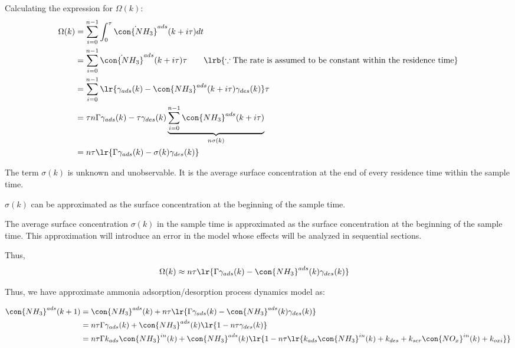 Calculating the expression for $\Omega(k)$:
\begin{align*}
    \Omega(k) &= \sum_{i=0}^{n-1} \int_{0}^{\tau} \dot{\con{NH_3}}^{ads} (k + i\tau) dt\\
    &= \sum_{i=0}^{n-1} \dot{\con{NH_3}}^{ads} (k + i\tau) \tau \qquad \lrb{\because \text{The rate is assumed to be constant within the residence time}}\\
    &= \sum_{i=0}^{n-1} \lr{\gamma_{ads} (k) - \con{NH_3}^{ads} (k + i \tau) \gamma_{des} (k)} \tau\\
    &= \tau n \Gamma \gamma_{ads} (k) - \tau \gamma_{des} (k) \underbrace{\sum_{i=0}^{n-1} \con{NH_3}^{ads} (k + i \tau) }_{n \sigma(k)} \\
    &= n \tau \lr{\Gamma \gamma_{ads} (k) - \sigma(k) \gamma_{des} (k)}
\end{align*}

The term $\sigma(k)$ is unknown and unobservable. It is the average surface
concentration at the end of every residence time within the sample time.

 $\sigma(k)$ can be approximated as the surface concentration at the beginning of the sample time.

The average surface concentration $\sigma(k)$ in the sample time is approximated
as the surface concentration at the beginning of the sample time. This
approximation will introduce an error in the model whose effects will be
analyzed in sequential sections.

Thus,
\begin{align}
    \Omega(k) &\approx n \tau \lr{\Gamma \gamma_{ads} (k) - \con{NH_3}^{ads}(k) \gamma_{des} (k)}
\end{align}

Thus, we have approximate ammonia adsorption/desorption process dynamics model as:

\begin{align*}
    \con{NH_3}^{ads}(k + 1) &= \con{NH_3}^{ads} (k) + n \tau \lr{\Gamma \gamma_{ads} (k) - \con{NH_3}^{ads}(k) \gamma_{des} (k)}\\
    &= n \tau \Gamma \gamma_{ads} (k) + \con{NH_3}^{ads} (k) \lr{1 - n \tau \gamma_{des} (k)}\\
    &= n \tau \Gamma k_{ads} \con{NH_3}^{in}(k)  + \con{NH_3}^{ads} (k) \lr{1 - n \tau \lr{k_{ads} \con{NH_3}^{in}(k) + k_{des} + k_{scr} \con{NO_x}^{in}(k) + k_{oxi}}}
\end{align*}


